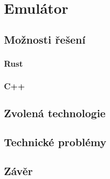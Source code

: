 \chapter{Emulátor}

\blind[2]

\section{Možnosti řešení}

\blind[1]

\subsection{Rust}

\blind[2]

\subsection{C++}

\blind[3]

\section{Zvolená technologie}

\blind[2]

\section{Technické problémy}

\blind[2]

\section{Závěr}

\blind[1]